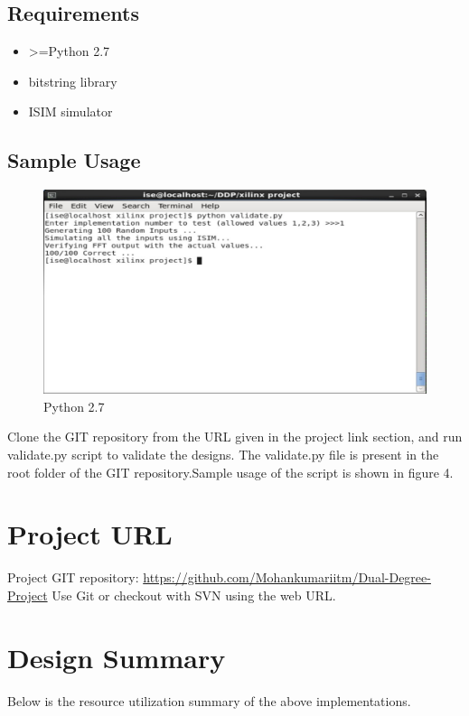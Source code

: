 \documentclass{article}
\begin{document}
\subsection{Requirements}
\begin{itemize}
  \item >=Python 2.7
  \item bitstring library
  \item ISIM simulator
\end{itemize}

\subsection{Sample Usage}
\begin{figure}[h!]
  \caption{Python 2.7}
  \includegraphics[width=1.0\columnwidth]{simulation_images/figure_4.jpg} 
\end{figure}

Clone the GIT repository from the URL given in the project link section, and run validate.py script to validate the designs.
The validate.py file is present in the root folder of the GIT repository.Sample usage of the script is shown in figure 4.

\section{Project URL}
Project GIT repository: \href {https://github.com/Mohankumariitm/Dual-Degree-Project}{https://github.com/Mohankumariitm/Dual-Degree-Project}
Use Git or checkout with SVN using the web URL.

\section{Design Summary}
Below is the resource utilization summary of the above implementations.
\end{document}
